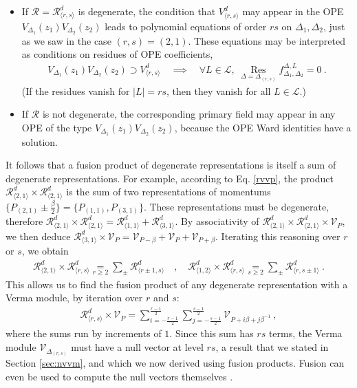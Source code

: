 \documentclass[12pt, a4paper]{article}
\theoremstyle{break}
\begin{document}
\begin{itemize}
 \item If $\mathcal{R}=\mathcal{R}^d_{\langle r,s\rangle}$ is degenerate, the condition that $V^d_{\langle r,s\rangle}$ may appear in the OPE $V_{\Delta_1}(z_1)V_{\Delta_2}(z_2)$ leads to polynomial equations of order $rs$ on $\Delta_1,\Delta_2$, just as we saw in the case $(r,s)=(2,1)$. These equations may be interpreted as conditions on residues of OPE coefficients,
 \begin{align}
  V_{\Delta_1}(z_1)V_{\Delta_2}(z_2) \supset V^d_{\langle r,s\rangle} \quad \implies \quad \forall L\in \mathcal{L},\ \underset{\Delta=\Delta_{(r,s)}}{\operatorname{Res}} f^{\Delta,L}_{\Delta_1,\Delta_2} = 0\ .
 \end{align}
 (If the residues vanish for $|L|=rs$, then they vanish for all $L\in\mathcal{L}$.)
 \item If $\mathcal{R}$ is not degenerate, the corresponding primary field may appear in any OPE of the type $V_{\Delta_1}(z_1)V_{\Delta_2}(z_2)$, because the OPE Ward identities have a solution. 
\end{itemize}
It follows that a fusion product of degenerate representations is itself a sum of degenerate representations. 
For example, according to Eq. \eqref{rvvp}, the product $\mathcal{R}^d_{\langle 2,1\rangle}\times\mathcal{R}^d_{\langle 2,1\rangle}$ is the sum of two representations of momentums $\{P_{(2,1)} \pm \frac{\beta}{2}\} = \{P_{(1,1)},P_{(3,1)}\}$. These representations must be degenerate, therefore $\mathcal{R}^d_{\langle 2,1\rangle}\times\mathcal{R}^d_{\langle 2,1\rangle}=\mathcal{R}^d_{\langle 1,1\rangle}+\mathcal{R}^d_{\langle 3,1\rangle}$. By associativity of $\mathcal{R}^d_{\langle 2,1\rangle}\times\mathcal{R}^d_{\langle 2,1\rangle}\times \mathcal{V}_P$, we then deduce 
$
 \mathcal{R}^d_{\langle 3,1\rangle} \times \mathcal{V}_P = \mathcal{V}_{P-\beta}+\mathcal{V}_P+\mathcal{V}_{P+\beta}
$. Iterating this reasoning over $r$ or $s$, we obtain 
\begin{align}
 \mathcal{R}^d_{\langle 2,1\rangle}\times \mathcal{R}^d_{\langle r,s\rangle} 
 \underset{r\geq 2}{=} \sum_\pm \mathcal{R}^d_{\langle r\pm 1,s\rangle} 
 \quad , \quad 
 \mathcal{R}^d_{\langle 1,2\rangle}\times \mathcal{R}^d_{\langle r,s\rangle} 
 \underset{s\geq 2}{=}\sum_\pm \mathcal{R}^d_{\langle r,s\pm 1\rangle} \ .
 \label{rrrs}
\end{align}
This allows us to find the fusion product of any degenerate representation with a Verma module, by iteration over $r$ and $s$:
\begin{align}
 \boxed{\mathcal{R}^d_{\langle r,s\rangle}\times \mathcal{V}_P = \sum_{i=-\frac{r-1}{2}}^{\frac{r-1}{2}} \sum_{j=-\frac{s-1}{2}}^{\frac{s-1}{2}} \mathcal{V}_{P+i\beta +j\beta^{-1}}}\ ,
 \label{rrsvp}
\end{align}
where the sums run by increments of $1$. Since this sum has $rs$ terms, the Verma module $\mathcal{V}_{\Delta_{(r,s)}}$ must have a null vector at level $rs$, a result that we stated in Section \ref{sec:nvvm}, and which we now derived using fusion products. Fusion can even be used to compute the null vectors themselves \cite{fms97}. 
\end{document}
